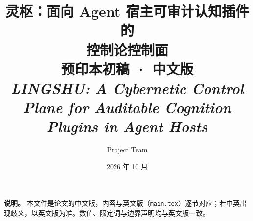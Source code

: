 \documentclass[11pt]{article}
\title{灵枢：面向 Agent 宿主可审计认知插件的\\控制论控制面\\[6pt]
\large 预印本初稿 · 中文版\\[2pt]
\normalsize\itshape LINGSHU: A Cybernetic Control Plane for Auditable Cognition Plugins in Agent Hosts}
\author{\system{} Project Team}
\date{2026 年 10 月}
\renewcommand{\abstractname}{摘要}
\begin{document}
\maketitle

\noindent\textbf{说明。} 本文件是论文的中文版，内容与英文版（\texttt{main.tex}）逐节对应；若中英出现歧义，以英文版为准。数值、限定词与边界声明均与英文版一致。

\begingroup
\renewcommand{\abstractname}{摘要}

\endgroup


























\end{document}
